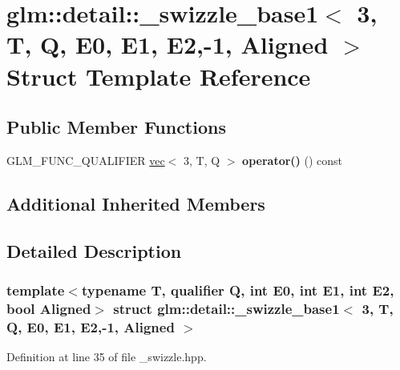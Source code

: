 \hypertarget{structglm_1_1detail_1_1__swizzle__base1_3_013_00_01T_00_01Q_00_01E0_00_01E1_00_01E2_00-1_00_01Aligned_01_4}{}\section{glm\+:\+:detail\+:\+:\+\_\+swizzle\+\_\+base1$<$ 3, T, Q, E0, E1, E2,-\/1, Aligned $>$ Struct Template Reference}
\label{structglm_1_1detail_1_1__swizzle__base1_3_013_00_01T_00_01Q_00_01E0_00_01E1_00_01E2_00-1_00_01Aligned_01_4}
\subsection*{Public Member Functions}
\begin{DoxyCompactItemize}
\item 
\mbox{\label{structglm_1_1detail_1_1__swizzle__base1_3_013_00_01T_00_01Q_00_01E0_00_01E1_00_01E2_00-1_00_01Aligned_01_4_a52562036288d3f7a063c5172f4b572ab}} 
G\+L\+M\+\_\+\+F\+U\+N\+C\+\_\+\+Q\+U\+A\+L\+I\+F\+I\+ER \hyperlink{structglm_1_1vec}{vec}$<$ 3, T, Q $>$ {\bfseries operator()} () const
\end{DoxyCompactItemize}
\subsection*{Additional Inherited Members}


\subsection{Detailed Description}
\subsubsection*{template$<$typename T, qualifier Q, int E0, int E1, int E2, bool Aligned$>$\newline
struct glm\+::detail\+::\+\_\+swizzle\+\_\+base1$<$ 3, T, Q, E0, E1, E2,-\/1, Aligned $>$}



Definition at line 35 of file \+\_\+swizzle.\+hpp.




